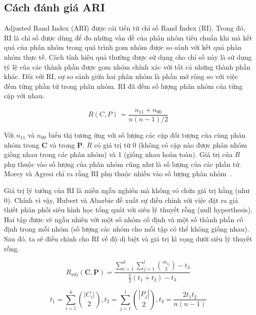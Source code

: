 		
\subsection{Cách đánh giá ARI}
Adjusted Rand Index (ARI) được cải tiến từ chỉ số Rand Index (RI).
Trong đó, RI là chỉ số được dùng để đo những vấn đề của phân nhóm tiêu chuẩn khi mà kết quả của phân nhóm trong quá trình gom nhóm được so sánh với kết quả phân nhóm thực tế.
Cách tính hiệu quả thường được sử dụng cho chỉ số này là sử dụng tỷ lệ của các thành phần được gom nhóm chính xác với tất cả những thành phần khác.
Đối với RI, sự so sánh giữa hai phân nhóm là phần mở rộng so với việc đếm từng phần tử trong phân nhóm.
RI đã đếm số lượng phân nhóm của từng cặp với nhau.
\begin{center}
\begin{equation}
R(C,P) \, = \frac{n_{11} + n_{00}}{n(n - 1) / 2}
\end{equation}
\end{center}

Với $n_{11}$ và $n_{00}$ biểu thị tương ứng với số lượng các cặp đối tượng của cùng phân nhóm trong $\textbf{C}$ và trong $\textbf{P}$.
$R$ có giá trị từ 0 (không có cặp nào được phân nhóm giống nhau trong các phân nhóm) và 1 (giống nhau hoàn toàn).
Giá trị của $R$ phụ thuộc vào số lượng của phân nhóm cũng như là số lượng của các phần tử.
Morey và Agresi chỉ ra rằng RI phụ thuộc nhiều vào số lượng phân nhóm~\cite{Morey-Agresti}.

Giá trị lý tưởng của RI là miền ngẫu nghiên mà không có chứa giá trị hằng (như $0$).
Chính vì vậy, Hubert và Abarbie đề xuất sự điều chỉnh với việc đặt ra giả thiết phân phối siêu hình học tổng quát với siêu lý thuyết rỗng (null hyperthesis).
Hai tập được vẽ ngẫu nhiên với một số nhóm cố định và một số thành phần cố định trong mỗi nhóm (số lượng các nhóm cho mỗi tập có thể không giống nhau).
Sau đó, ta sẽ điều chỉnh cho RI về độ dị biệt và giá trị kì vọng dưới siêu lý thuyết rỗng.
\begin{center}
\begin{equation} \label{eq:ARI}
R_{adj}(\textbf{C}, \textbf{P}) = \frac{\sum^k_{i=1} \sum^l_{j=1} \binom {m_{ij}}  {2} - t_3}{\frac{1}{2} (t_1 + t_2) - t_3}
\end{equation}

\begin{equation} \label{eq:ARIParts}
t_1 = \sum^k_{i=1} \binom {|C_i|} {2} , t_2 = \sum_{j=1}^l \binom {|P_j|} {2}, t_3 = \frac{2 t_1 t_2}{n (n - 1)}
\end{equation}
\end{center}

